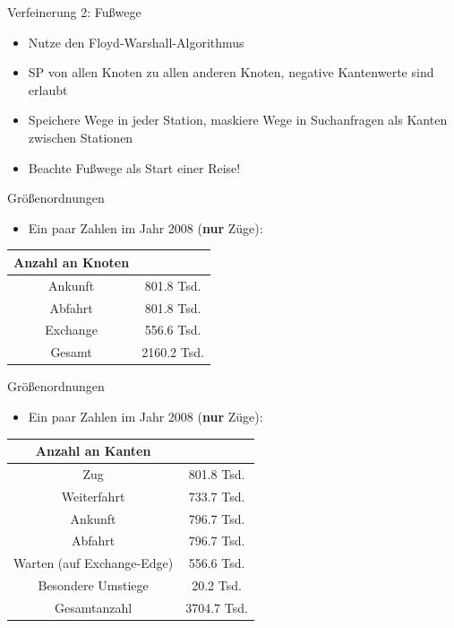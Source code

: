 \begin{frame}{Verfeinerung 2: Fußwege}
	\begin{itemize}
		\item Nutze den Floyd-Warshall-Algorithmus
		\pause
		\item SP von allen Knoten zu allen anderen Knoten, negative Kantenwerte sind erlaubt
		\pause
		\item Speichere Wege in jeder Station, maskiere Wege in Suchanfragen als Kanten zwischen Stationen
		\item Beachte Fußwege als Start einer Reise!
	\end{itemize}
\end{frame}


\begin{frame}{Größenordnungen}
	\begin{itemize}
		\item Ein paar Zahlen im Jahr 2008 (\textbf{nur} Züge):
	\end{itemize}

	\begin{center}
		\begin{tabular}{ c|c } 
			Anzahl an Knoten & \\
 			\hline
 			Ankunft & 801.8 Tsd. \\
 			Abfahrt & 801.8 Tsd. \\
 			Exchange & 556.6 Tsd. \\
 			\hline
 			Gesamt & 2160.2 Tsd.
		\end{tabular}
	\end{center}
\end{frame}


\begin{frame}{Größenordnungen}
	\begin{itemize}
		\item Ein paar Zahlen im Jahr 2008 (\textbf{nur} Züge):
	\end{itemize}

	\begin{center}
		\begin{tabular}{ c|c } 
			Anzahl an Kanten & \\
 			\hline
 			Zug & 801.8 Tsd. \\
 			Weiterfahrt & 733.7 Tsd. \\
 			Ankunft & 796.7 Tsd. \\
 			Abfahrt & 796.7 Tsd. \\
 			Warten (auf Exchange-Edge) & 556.6 Tsd. \\
 			Besondere Umstiege & 20.2 Tsd. \\
 			\hline
 			Gesamtanzahl & 3704.7 Tsd.
		\end{tabular}
	\end{center}
\end{frame}



